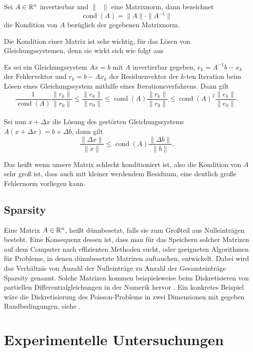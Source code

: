 \documentclass{scrartcl}
\begin{document}
\begin{definition}\cite[p.~25]{Iterative}
    Sei \(A \in \mathbb{R}^n\) invertierbar und \(\| \phantom{x}\|\) eine Matrixnorm, dann bezeichnet
    \[\operatorname{cond}(A)=\|A\| \cdot\|A^{-1}\|\]
    die Kondition von \(A\) bezüglich der gegebenen Matrixnorm.
\end{definition}
Die Kondition einer Matrix ist sehr wichtig, für das Lösen von Gleichungssystemen, denn sie wirkt sich wie folgt aus
\begin{theorem}\cite[p.~26-27]{Iterative}
    Es sei ein Gleichungssystem \(Ax=b\) mit \(A\) invertierbar gegeben, \(e_k = A^{-1}b-x_k\) der Fehlervektor und \(r_k = b - Ax_k\) der Residuenvektor der \(k\)-ten Iteration beim Lösen eines Gleichungssystem mithilfe eines Iterationsverfahrens.
    Dann gilt
    \[\frac{1}{\operatorname{cond}(A)} \frac{\|r_k\|}{\|r_0\|} \leq \frac{\|e_k\|}{\|e_0\|} \leq \operatorname{cond}(A) \frac{\|r_k\|}{\|r_0\|} \leq \operatorname{cond}(A)^2 \frac{\|e_k\|}{\|e_0\|}.\]
    \\
    Sei nun \(x+\Delta x\) die Lösung des gestörten Gleichungssystems \(A(x + \Delta x)= b+ \Delta b\), dann gilt
    \[\frac{\|\Delta x\|}{\|x\|} \leq \operatorname{cond}(A) \frac{\|\Delta b\|}{\|b\|}.\]
\end{theorem}
Das heißt wenn unsere Matrix schlecht konditioniert ist, also die Kondition von \(A\) sehr groß ist, dass auch mit kleiner werdendem Residuum, eine deutlich große Fehlernorm vorliegen kann.

\subsection{Sparsity}
Eine Matrix \(A \in \mathbb{R}^n \), heißt dünnbesetzt, falls sie zum Großteil aus Nulleinträgen besteht.
Eine Konsequenz dessen ist, dass man für das Speichern solcher Matrizen auf dem Computer nach effizienten Methoden sucht, oder geeigneten Algorithmen für Probleme, in denen dünnbesetzte Matrizen auftauchen, entwickelt. Dabei wird das Verhältnis von Anzahl der Nulleinträge zu Anzahl der Gesamteinträge Sparsity genannt. Solche Matrizen kommen beispielsweise beim Diskretisieren von partiellen Differentialgleichungen in der Numerik hervor \cite{dewiki:233309191}.
Ein konkretes Beispiel wäre die Diskretisierung des Poisson-Problems in zwei Dimensionen mit gegeben Randbedingungen, siehe \cite{HandoutLU}.





\section{Experimentelle Untersuchungen}
\end{document}
